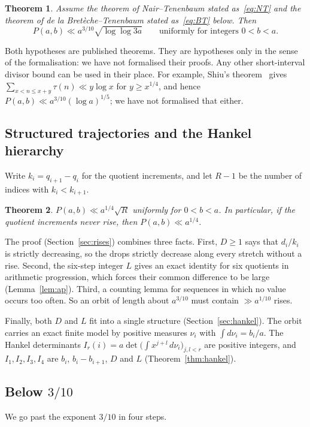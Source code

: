 \documentclass[11pt]{amsart}
\newtheorem{theorem}{Theorem}[section]
\theoremstyle{definition}
\theoremstyle{remark}
\begin{document}
\begin{theorem}\label{thm:loglog}
Assume the theorem of Nair--Tenenbaum stated as~\eqref{eq:NT} and the theorem of de la
Bret\`eche--Tenenbaum stated as~\eqref{eq:BT} below. Then
\[
P(a,b)\ll a^{3/10}\sqrt{\log\log 3a}\qquad\text{uniformly for integers }0<b<a .
\]
\end{theorem}

Both hypotheses are published theorems. They are hypotheses only in the sense of the
formalisation: we have not formalised their proofs. Any other short-interval divisor bound
can be used in their place. For example, Shiu's theorem~\cite{Shiu} gives
$\sum_{x<n\le x+y}\tau(n)\ll y\log x$ for $y\ge x^{1/4}$, and hence
$P(a,b)\ll a^{3/10}(\log a)^{1/5}$; we have not formalised that either.

\subsection*{Structured trajectories and the Hankel hierarchy}
Write $k_i=q_{i+1}-q_i$ for the quotient increments, and let $R-1$ be the number of indices with
$k_i<k_{i+1}$.

\begin{theorem}\label{thm:rises}
$P(a,b)\ll a^{1/4}\sqrt R$ uniformly for $0<b<a$. In particular, if the quotient increments
never rise, then $P(a,b)\ll a^{1/4}$.
\end{theorem}

The proof (Section~\ref{sec:rises}) combines three facts. First, $D\ge1$ says that $d_i/k_i$ is
strictly decreasing, so the drops strictly decrease along every stretch without a rise. Second,
the six-step integer $L$ gives an exact identity for six quotients in arithmetic progression,
which forces their common difference to be large (Lemma~\ref{lem:ap}). Third, a counting lemma
for sequences in which no value occurs too often. So an orbit of length about $a^{3/10}$ must
contain $\gg a^{1/10}$ rises.

Finally, both $D$ and $L$ fit into a single structure (Section~\ref{sec:hankel}). The orbit
carries an exact finite model by positive measures $\nu_i$ with $\int d\nu_i=b_i/a$. The Hankel
determinants $I_r(i)=a\det\bigl(\int x^{j+l}\,d\nu_i\bigr)_{j,l<r}$ are positive integers, and
$I_1,I_2,I_3,I_4$ are $b_i$, $b_i-b_{i+1}$, $D$ and $L$ (Theorem~\ref{thm:hankel}).

\subsection*{Below \texorpdfstring{$3/10$}{3/10}}
We go past the exponent $3/10$ in four steps.
\end{document}
